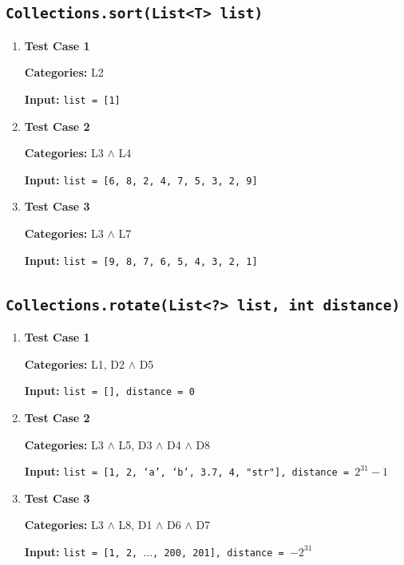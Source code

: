 \documentclass[12pt, a4paper]{article}
\begin{document}
\subsection{\texttt{Collections.sort(List<T> list)}}
\begin{enumerate}
  \item \textbf{Test Case 1}
  \par\quad\textbf{Categories:} L2

  \par\quad\textbf{Input:} \texttt{list = [1]}

  \item \textbf{Test Case 2}
  \par\quad\textbf{Categories:} L3 $\wedge$ L4

  \par\quad\textbf{Input:} \texttt{list = [6, 8, 2, 4, 7, 5, 3, 2, 9]}

  \item \textbf{Test Case 3}
  \par\quad\textbf{Categories:} L3 $\wedge$ L7
  \par\quad\textbf{Input:} \texttt{list = [9, 8, 7, 6, 5, 4, 3, 2, 1]}
\end{enumerate}

\subsection{\texttt{Collections.rotate(List<?> list, int distance)}}
\begin{enumerate}
  \item \textbf{Test Case 1}
  \par\quad\textbf{Categories:} L1, D2 $\wedge$ D5
  \par\quad\textbf{Input:} \texttt{list = [], distance = 0}

  \item \textbf{Test Case 2}
  \par\quad\textbf{Categories:} L3 $\wedge$ L5, D3 $\wedge$ D4 $\wedge$ D8
  \par\quad\textbf{Input:} \texttt{list = [1, 2, `a', `b', 3.7, 4, "str"], distance = $2^{31} - 1$}

  \item \textbf{Test Case 3}
  \par\quad\textbf{Categories:} L3 $\wedge$ L8, D1 $\wedge$ D6 $\wedge$ D7
  \par\quad\textbf{Input:} \texttt{list = [1, 2, $\dots$, 200, 201], distance = $-2^{31}$}
\end{enumerate}
\end{document}
